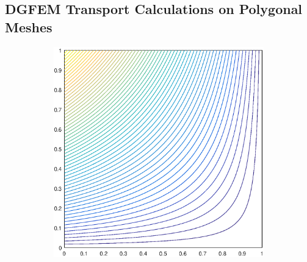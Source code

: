 \documentclass[11pt]{article}
\begin{document}
\subsection{DGFEM Transport Calculations on Polygonal Meshes}
\label{sec::CW_poly}



\begin{figure}
\label{fig::2D_Linear_Summary_unit_square_basis_functions}
\centering
	\begin{subfigure}[b]{0.225\textwidth}
		\centering
		\includegraphics[width=\textwidth]{figures/square_WACHSPRESS1_contour_b4.eps}
		\caption{}
	\end{subfigure}
	\hspace{1cm}
	\begin{subfigure}[b]{0.225\textwidth}
		\centering

\end{subfigure}
\end{figure}
\end{document}
